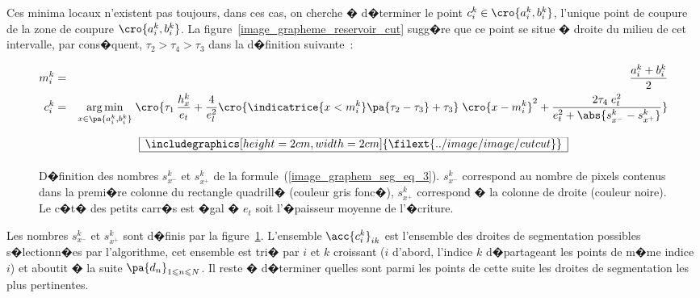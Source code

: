 Ces minima locaux n'existent pas toujours, dans ces cas, on cherche � d�terminer le point $c_i^k \in \cro{a_i^k, b_i^k}$, l'unique point de coupure de la zone de coupure $\cro{a_i^k, b_i^k}$. La figure~\ref{image_grapheme_reservoir_cut} sugg�re que ce point se situe � droite du milieu de cet intervalle, par cons�quent, $\tau_2 > \tau_4 > \tau_3$ dans la d�finition suivante~:

            \begin{eqnarray}
            m_i^k    &=&                    \frac{a_i^k + b_i^k}{2} \nonumber \\
            c^k_i &=&               \underset{x \in \pa{a_i^k, b_i^k}}{\arg \min} \; \cro {
                                                \tau_1     \, \frac{h_x^k}{e_t}  + 
                                                \frac{4}{e_l^2}    \cro{ \indicatrice{x < m_i^k} 
                                                                                                \pa{\tau_2 - \tau_3} + \tau_3}  \;
                                                                                  \cro{x - m_i^k}^2  +
                                                \frac{2 \tau_4 \; e_t^2}{e_t^2 + \abs{s_{x^-}^k - s_{x^+}^k} }
                                                }
            \label{image_graphem_seg_eq_3}
            \end{eqnarray}
            



            \begin{figure}[ht]
        $$\frame{$\begin{array}[c]{c}\includegraphics[height=2cm, width=2cm]
        {\filext{../image/image/cutcut}}\end{array}$}$$
        \caption{    D�finition des nombres $s_{x^-}^k$ et $s_{x^+}^k$ de la 
                            formule~(\ref{image_graphem_seg_eq_3}). $s_{x^-}^k$ correspond au nombre de pixels contenus
                            dans la premi�re colonne du rectangle quadrill� (couleur gris fonc�), $s_{x^+}^k$ correspond
                            � la colonne de droite (couleur noire). Le c�t� des petits carr�s est �gal � $e_t$ soit
                            l'�paisseur moyenne de l'�criture.
                            }
        \label{image_graphem_aire_cut}
            \end{figure}



Les nombres $s_{x^-}^k$ et $s_{x^+}^k$ sont d�finis par la figure~\ref{image_graphem_aire_cut}. L'ensemble $\acc{c^k_i}_{ik}$ est l'ensemble des droites de segmentation possibles s�lectionn�es par l'algorithme, cet ensemble est tri� par $i$ et $k$ croissant ($i$ d'abord, l'indice $k$ d�partageant les points de m�me indice $i$) et aboutit � la suite $\pa{d_n}_{ 1 \leqslant n \leqslant N }$. Il reste � d�terminer quelles sont parmi les points de cette suite les droites de segmentation les plus pertinentes.


